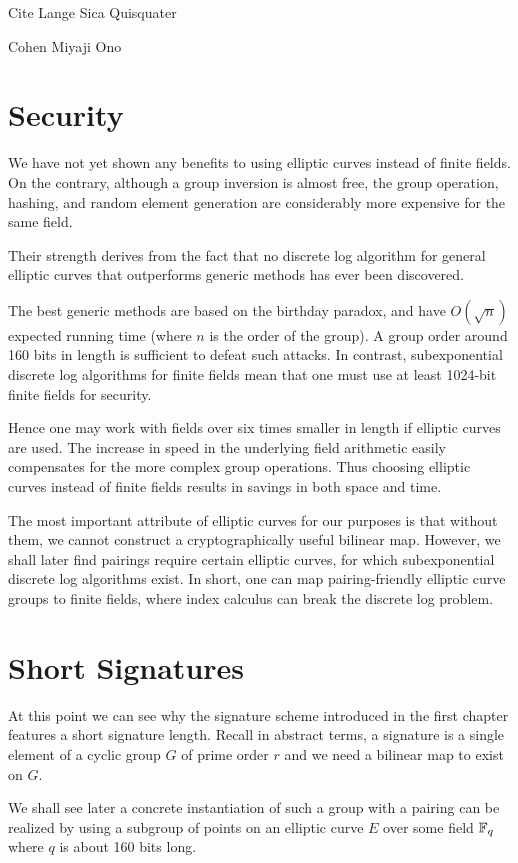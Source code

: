 Cite Lange Sica Quisquater

Cohen Miyaji Ono

\section {Security}

We have not yet shown any benefits to using elliptic curves instead
of finite fields. On the contrary, although a group inversion is
almost free, the group operation, hashing, and random element generation
are considerably more expensive for the same field.

Their strength derives from the fact that no discrete log algorithm for
general elliptic curves that outperforms generic methods has ever been
discovered.

The best generic methods are based on the birthday paradox, and have
$O(\sqrt{n})$ expected running time (where $n$ is the order of the group).
A group order around 160 bits in length is sufficient to defeat such attacks.
In contrast, subexponential discrete log algorithms for finite fields
mean that one must use at least 1024-bit finite fields for security.

Hence one may work with fields over six times smaller in length
if elliptic curves are used. The increase in speed in
the underlying field arithmetic easily compensates for the more
complex group operations. Thus choosing elliptic curves instead of
finite fields results in savings in both space and time.

The most important attribute of elliptic curves for our purposes
is that without them, we cannot construct a cryptographically
useful bilinear map.
However, we shall later find pairings require certain elliptic curves,
for which subexponential discrete log algorithms exist. In short,
one can map pairing-friendly elliptic curve groups to finite fields, where
index calculus can break the discrete log problem.

\section {Short Signatures}

At this point we can see why
the signature scheme introduced
in the first chapter features a short signature length.
Recall in abstract terms,
a signature is a single element of a cyclic group $G$ of prime order $r$
and we need a bilinear map to exist on $G$.

We shall see later
a concrete instantiation of such a group with a pairing
can be realized by using a subgroup of points
on an elliptic curve $E$ over some field $\mathbb{F}_q$ where
$q$ is about 160 bits long.

